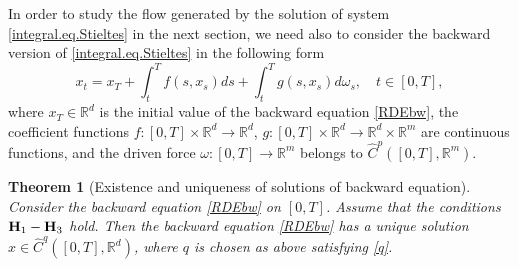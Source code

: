 \documentclass[10pt]{article}
\numberwithin{equation}{section} %
\newcommand{\R}{\ensuremath{\mathbb{R}}}
\newtheorem{theorem}{Theorem}[section]
{ \theorembodyfont{\normalfont} %
\newtheorem{example}[theorem]{Example}
\newtheorem{remark}[theorem]{Remark}
}
\begin{document}
In order to study the flow generated by the solution of system \eqref{integral.eq.Stieltes} in the next section, we need also to consider the backward version of \eqref{integral.eq.Stieltes} in the following form
  \begin{equation}\label{RDEbw}
 x_t = x_T + \int_t^T f(s,x_s) ds +  \int_t^T  g(s,x_s) d\omega_s, \quad t\in [0,T],
 \end{equation}
 where $x_T\in\R^d$ is the initial value of the backward equation \eqref{RDEbw}, the coefficient functions $f: [0,T] \times \R^d \rightarrow \R^d$,  
 $g: [0,T] \times \R^d \rightarrow \R^d\times \R^m$ are continuous functions, and the driven force $\omega: [0,T] \rightarrow \R^m$ belongs to $\widehat{C}^{p}([0,T],\R^m)$.
 
  \begin{theorem}[Existence and uniqueness of solutions of backward equation]\label{theo3}
   Consider the backward equation
  \eqref{RDEbw} on $[0,T]$. 
   Assume that the conditions ${\textbf H}_1-{\textbf H}_3$ hold.
  Then the backward equation \eqref{RDEbw} has a unique solution $x\in \widehat{C}^{q}([0,T],\R^d)$,  where $q$ is chosen as above satisfying \eqref{q}. 
  \end{theorem}
\end{document}
